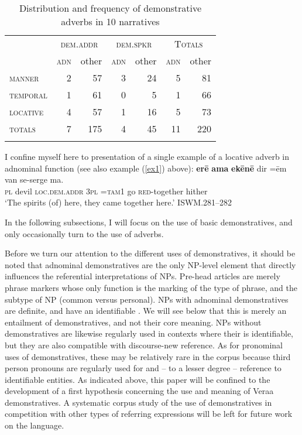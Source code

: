 \documentclass[output=paper
,modfonts
,nonflat]{langsci/langscibook}
\begin{document}
\begin{table}
\caption{Distribution and frequency of demonstrative adverbs in 10 narratives}
\label{vrademadvdistrfreq}
 \begin{tabularx}{.7\textwidth}{Xrrrrrr} 
  \lsptoprule
            & \multicolumn{2}{c}{\textsc{dem.addr}}  & \multicolumn{2}{c}{\textsc{dem.spkr}} 	&	\multicolumn{2}{c}{\textsc{Totals}}		\\\cmidrule(lr){2-3}\cmidrule(lr){4-5}\cmidrule(lr){6-7} 
						&	\textsc{adn}	&	other	&	\textsc{adn}	&	other	&	\textsc{adn}	&	other	\\
  \midrule
\textsc{manner}		& 2 & 57	&	3		&	24	&	5	& 81	\\
\textsc{temporal}& 1	&	61	&	0	&	5		&	1	&	66	\\
\textsc{locative}	&	4	&	57	&	1	&	16	&	5	&	73	\\
		\midrule
\textsc{totals}			&	7	&	175	&	4	&	45	&	11	&	220	\\
  \lspbottomrule
 \end{tabularx}
\end{table}

I confine myself here to presentation of a single example of a locative adverb in adnominal function (see also example (\ref{ex1}) above):
\ea \label{ex12}
\gll		\textbf{{\textquotesingle}er\={e}}	\textbf{{\textquotesingle}ama{\textquotesingle}}	\textbf{{\textquotesingle}ek\=en\=e}	dir	=\=em		van 	se-serge			ma.	\\
		\textsc{pl}		devil	\textsc{loc.dem.addr}	\textsc{3pl}	\textsc{=tam1}	go	\textsc{red-}together		hither	\\
\glt		`The spirits (of) here, they came together here.'		\hfill{ISWM.281--282}
\z

\noindent
In the following subsections, I will focus on the use of basic demonstratives, and only occasionally turn to the use of  adverbs.

Before we turn our attention to the different uses of demonstratives, it should be noted that adnominal demonstratives are the only NP-level element that directly influences the referential interpretations of NPs. Pre-head articles are merely phrase markers whose only function is the marking of the type of phrase, and the subtype of NP (common versus personal). NPs with adnominal demonstratives are definite, and have an identifiable . We will see below that this is merely an entailment of demonstratives, and not their core meaning. NPs without demonstratives are likewise regularly used in contexts where their  is identifiable, but they are also compatible with discourse-new reference. As for pronominal uses of demonstratives, these may be relatively rare in the corpus because third person pronouns are regularly used for  and -- to a lesser degree --  reference to identifiable entities. As indicated above, this paper will be confined to the development of a first hypothesis concerning the use and meaning of Vera{\textquotesingle}a demonstratives. A systematic corpus study of the use of demonstratives in competition with other types of referring expressions will be left for future work on the language.
\end{document}
